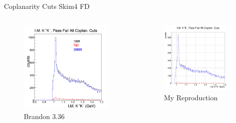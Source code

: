 \documentclass[aspectratio=169]{beamer}
\begin{document}
\begin{frame}{Coplanarity Cuts \hfill Skim4 FD}
\vspace*{-0.6cm}
    \begin{columns}
    \begin{figure}
        \centering
        \includegraphics[width=0.94\textwidth]{brandon_figs/36.png}
        \caption{Brandon 3.36}
    \end{figure}
    \begin{figure}
        \centering
        \includegraphics[width=0.97\textwidth]{pdfs/36.png}
        \caption{My Reproduction}
    \end{figure}
    \end{columns}
\end{frame}
\end{document}
